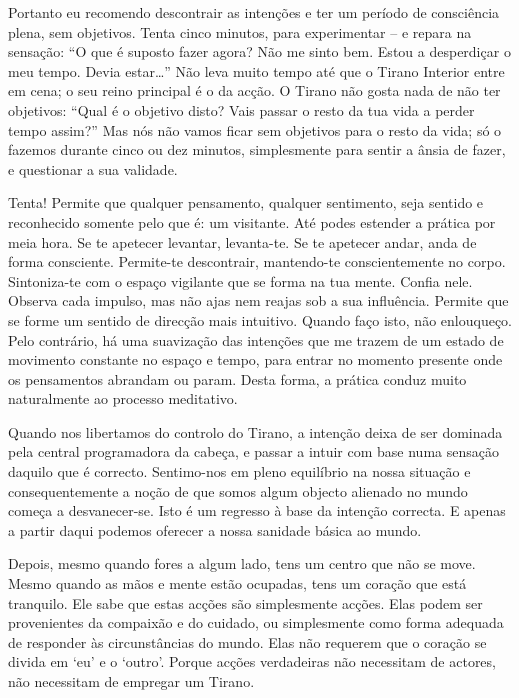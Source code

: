 Portanto eu recomendo descontrair as intenções e ter um período de
consciência plena, sem objetivos. Tenta cinco minutos, para experimentar
-- e repara na sensação: “O que é suposto fazer agora? Não me sinto bem.
Estou a desperdiçar o meu tempo. Devia estar\ldots{}” Não leva muito tempo
até que o Tirano Interior entre em cena; o seu reino principal é o da
acção. O Tirano não gosta nada de não ter objetivos: “Qual é o objetivo
disto? Vais passar o resto da tua vida a perder tempo assim?” Mas nós
não vamos ficar sem objetivos para o resto da vida; só o fazemos durante
cinco ou dez minutos, simplesmente para sentir a ânsia de fazer, e
questionar a sua validade.

Tenta! Permite que qualquer pensamento, qualquer sentimento, seja
sentido e reconhecido somente pelo que é: um visitante. Até podes
estender a prática por meia hora. Se te apetecer levantar, levanta-te.
Se te apetecer andar, anda de forma consciente. Permite-te descontrair,
mantendo-te conscientemente no corpo. Sintoniza-te com o espaço
vigilante que se forma na tua mente. Confia nele. Observa cada impulso,
mas não ajas nem reajas sob a sua influência. Permite que se forme um
sentido de direcção mais intuitivo. Quando faço isto, não enlouqueço.
Pelo contrário, há uma suavização das intenções que me trazem de um
estado de movimento constante no espaço e tempo, para entrar no momento
presente onde os pensamentos abrandam ou param. Desta forma, a prática
conduz muito naturalmente ao processo meditativo.

\sectionBreak

Quando nos libertamos do controlo do Tirano, a intenção deixa de ser
dominada pela central programadora da cabeça, e passar a intuir com base
numa sensação daquilo que é correcto. Sentimo-nos em pleno equilíbrio na
nossa situação e consequentemente a noção de que somos algum objecto
alienado no mundo começa a desvanecer-se. Isto é um regresso à base da
intenção correcta. E apenas a partir daqui podemos oferecer a nossa
sanidade básica ao mundo.

Depois, mesmo quando fores a algum lado, tens um centro que não se move.
Mesmo quando as mãos e mente estão ocupadas, tens um coração que está
tranquilo. Ele sabe que estas acções são simplesmente acções. Elas podem
ser provenientes da compaixão e do cuidado, ou simplesmente como forma
adequada de responder às circunstâncias do mundo. Elas não requerem que
o coração se divida em `eu' e o `outro'. Porque acções verdadeiras não
necessitam de actores, não necessitam de empregar um Tirano.
